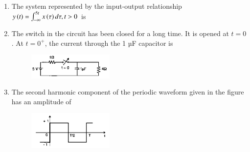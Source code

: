 \documentclass[12pt]{article}
\theoremstyle{remark}
\begin{document}
\begin{enumerate}
\item The system represented by the input-output relationship $y\left(t\right)=\int_{-\infty}^{5t}x\left(\tau\right)d\tau, t>0$ is
\begin{enumerate}
\end{enumerate}
\hfill{}

\item The switch in the circuit has been closed for a long time. It is opened at $t=0$. At $t=0^{+}$, the current through the 1 µF capacitor is
\begin{figure}[H]
    \centering
    \includegraphics[width=0.4\textwidth]{Figs/Q5.png}
    \caption{}
    \label{fig:1.1}
\end{figure}
\begin{enumerate}
\end{enumerate}
\hfill{}

\item The second harmonic component of the periodic waveform given in the figure has an amplitude of
\begin{figure}[H]
    \centering
    \includegraphics[width=0.4\textwidth]{Figs/Q6.png}
    \caption{}
    \label{fig:1.2}
\end{figure}
\begin{enumerate}
\end{enumerate}
\hfill{}


\end{enumerate}
\end{document}
